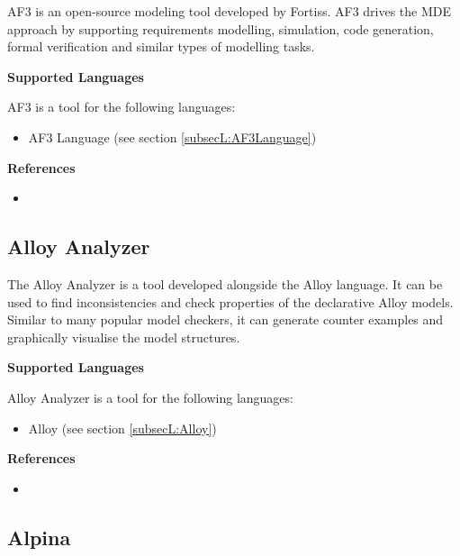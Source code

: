 AF3 is an open-source modeling tool developed by Fortiss. AF3 drives the MDE approach by supporting requirements modelling, simulation, code generation, formal verification and similar types of modelling tasks.

\textbf{Supported Languages}

AF3 is a tool for the following languages:
\begin{itemize}
	\item AF3 Language (see section \ref{subsecL:AF3Language})
\end{itemize}


\textbf{References}
\begin{itemize}
	
\item {}
\end{itemize}



\subsection{Alloy Analyzer}
\label{subsecT:AlloyAnalyzer}


The Alloy Analyzer is a tool developed alongside the Alloy language. 
It can be used to find inconsistencies and check properties of the declarative Alloy models. Similar to many popular model checkers, it can generate counter examples and graphically visualise the model structures.

\textbf{Supported Languages}

Alloy Analyzer is a tool for the following languages:
\begin{itemize}
	\item Alloy (see section \ref{subsecL:Alloy})
\end{itemize}


\textbf{References}
\begin{itemize}
	
\item {}
\end{itemize}



\subsection{Alpina}
\label{subsecT:Alpina}



